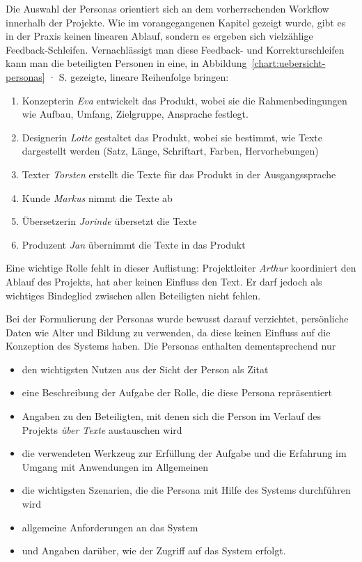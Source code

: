 Die Auswahl der Personas orientiert sich an dem vorherrschenden Workflow innerhalb der Projekte. Wie im vorangegangenen Kapitel gezeigt wurde, gibt es in der Praxis keinen linearen Ablauf, sondern es ergeben sich vielzählige Feedback-Schleifen. Vernachlässigt man diese Feedback- und Korrekturschleifen kann man die beteiligten Personen in eine, in Abbildung~\ref{chart:uebersicht-personas} · S.\pageref{chart:uebersicht-personas} gezeigte, lineare Reihenfolge bringen:
\begin{samepage}\begin{enumerate}\itemsep -5pt
\item Konzepterin \emph{Eva} entwickelt das Produkt, wobei sie die Rahmenbedingungen wie Aufbau, Umfang, Zielgruppe, Ansprache festlegt. 
\item Designerin \emph{Lotte} gestaltet das Produkt, wobei sie bestimmt, wie Texte dargestellt werden (Satz, Länge, Schriftart, Farben, Hervorhebungen)
\item Texter \emph{Torsten} erstellt die Texte für das Produkt in der Ausgangssprache
\item Kunde \emph{Markus} nimmt die Texte ab
\item Übersetzerin \emph{Jorinde} übersetzt die Texte
\item Produzent \emph{Jan} übernimmt die Texte in das Produkt
\end{enumerate}\end{samepage}

Eine wichtige Rolle fehlt in dieser Auflistung: Projektleiter \emph{Arthur} koordiniert den Ablauf des Projekts, hat aber keinen Einfluss den Text. Er darf jedoch als wichtiges Bindeglied zwischen allen Beteiligten  nicht fehlen.

Bei der Formulierung der Personas wurde bewusst darauf verzichtet, persönliche Daten wie Alter und Bildung zu verwenden, da diese keinen Einfluss auf die Konzeption des Systems haben. Die Personas enthalten dementsprechend nur 
\begin{itemize}\itemsep -5pt
\item den wichtigsten Nutzen aus der Sicht der Person als Zitat
\item eine Beschreibung der Aufgabe der Rolle, die diese Persona repräsentiert
\item Angaben zu den Beteiligten, mit denen sich die Person im Verlauf des Projekts \emph{über Texte} austauschen wird
\item die verwendeten Werkzeug zur Erfüllung der Aufgabe und die Erfahrung im Umgang mit Anwendungen im Allgemeinen
\item die wichtigsten Szenarien, die die Persona mit Hilfe des Systems durchführen wird
\item allgemeine Anforderungen an das System
\item und Angaben darüber, wie der Zugriff auf das System erfolgt.
\end{itemize}

